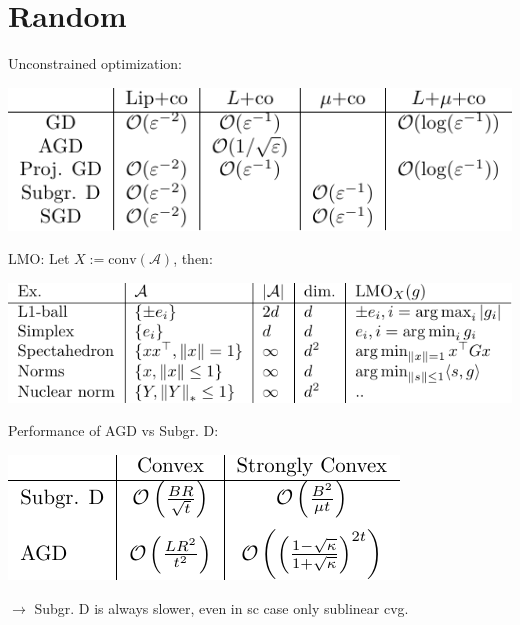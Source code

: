 \section*{Random}

Unconstrained optimization:

\begin{minipage}{\columnwidth}
    \centering
    \includegraphics[width=\columnwidth]{../assets/unconstrained-cvg-table/unconstrained-cvg-table.pdf}
\end{minipage}

LMO: Let $X := \text{conv}(\mathcal{A})$, then:

\begin{minipage}{\columnwidth}
    \centering
    \includegraphics[width=\columnwidth]{../assets/lmo-table/lmo-table.pdf}
\end{minipage}

Performance of AGD vs Subgr. D:

\begin{minipage}{0.8\columnwidth}
    \centering
    \includegraphics[width=\columnwidth]{../assets/non-smooth-subgr-table/non-smooth-subgr-table.pdf}
\end{minipage}

$\rightarrow$ Subgr. D is always slower, even in sc case only sublinear cvg.


